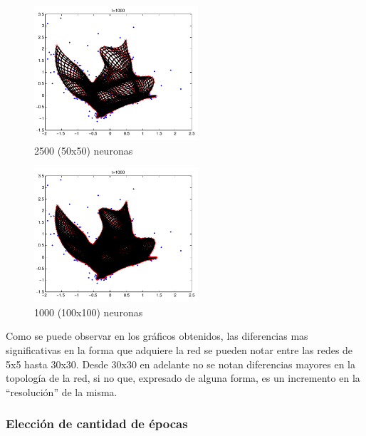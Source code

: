 \documentclass[informe.tex]{subfiles}
\begin{document}
      \begin{minipage}{0.45\textwidth}
	 \centering
	\begin{figure}[H]
	  \centering
	    \includegraphics[height=5cm,keepaspectratio]{graficos/malla/50x50.png}
		  \caption{\small 2500 (50x50) neuronas}
	\end{figure}
      \end{minipage}
      \begin{minipage}{0.45\textwidth}
	 \centering
	\begin{figure}[H]
	  \centering
	  \includegraphics[height=5cm,keepaspectratio]{graficos/malla/100x100.png}
                \caption{\small 1000 (100x100) neuronas}
	\end{figure}
      \end{minipage}
      
       \restoregeometry
       
       Como se puede observar en los gr\'aficos obtenidos, las diferencias mas significativas en la forma que adquiere la red se pueden notar entre las redes de 5x5 hasta 30x30. Desde 30x30 en adelante no se notan diferencias mayores en la topolog\'ia de la red, si no que, expresado de alguna forma, es un incremento en la ``resoluci\'on'' de la misma.
       
       \subsubsection{Elecci\'on de cantidad de \'epocas}
       
\end{document}
